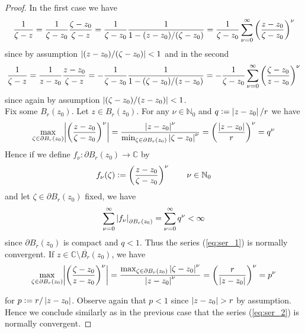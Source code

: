 \begin{enumerate}[label = \textbf{Exercise \arabic*.},wide = 0pt, itemsep=1.5ex]
	\begin{proof}
		In the first case we have
		\begin{equation}
			\frac{1}{\zeta - z} = \frac{1}{\zeta - z_0}\frac{\zeta - z_0}{\zeta - z} = \frac{1}{\zeta - z_0}\frac{1}{1 - (z - z_0)/(\zeta - z_0)} = \frac{1}{\zeta - z_0} \sum_{\nu = 0}^\infty \del{\frac{z - z_0}{\zeta - z_0}}^{\nu}
		\end{equation}
		\noindent since by assumption $\abs[0]{(z - z_0)/(\zeta - z_0)} < 1$ and in the second
		\begin{equation}
			\frac{1}{\zeta - z} = \frac{1}{z - z_0}\frac{z - z_0}{\zeta - z} = -\frac{1}{\zeta - z_0}\frac{1}{1 - (\zeta - z_0)/(z - z_0)} = -\frac{1}{\zeta - z_0} \sum_{\nu = 0}^\infty \del{\frac{\zeta - z_0}{z - z_0}}^{\nu}
		\end{equation}
		\noindent since again by assumption $\abs[0]{(\zeta - z_0)/(z - z_0)} < 1$.\\
		Fix some $B_r(z_0)$. Let $z \in B_r(z_0)$. For any $\nu \in \mathbb{N}_0$ and $q := \abs[0]{z - z_0}/r$ we have
		\begin{equation}
			\max_{\zeta \in \partial B_r(z_0)}\abs[3]{\del{\frac{z - z_0}{\zeta - z_0}}^\nu} = \frac{\abs[0]{z - z_0}^\nu}{\min_{\zeta \in \partial B_r(z_0)}\abs[0]{\zeta - z_0}^\nu} = \del[3]{\frac{\abs[0]{z - z_0}}{r}}^\nu = q^\nu
		\end{equation}
		Hence if we define $f_\nu: \partial B_r(z_0) \to \mathbb{C}$ by
		\begin{equation}
			f_\nu(\zeta) := \del{\frac{z - z_0}{\zeta - z_0}}^\nu \qquad \nu \in \mathbb{N}_0
		\end{equation}
		\noindent and let $\zeta \in \partial B_r(z_0)$ fixed, we have
		\begin{equation}
			\sum_{\nu = 0}^\infty \abs[0]{f_\nu}_{\partial B_r(z_0)} = \sum_{\nu = 0}^\infty q^\nu < \infty
		\end{equation}
		\noindent since $\partial B_r(z_0)$ is compact and $q < 1$. Thus the series (\ref{eq:ser_1}) is normally convergent. If $z \in \mathbb{C}\setminus \overline{B_r}(z_0)$, we have
		\begin{equation}
			\max_{\zeta \in \partial B_r(z_0)}\abs[3]{\del{\frac{\zeta - z_0}{z - z_0}}^\nu} = \frac{\max_{\zeta \in \partial B_r(z_0)}\abs[0]{\zeta - z_0}^\nu}{\abs[0]{z - z_0}^\nu} = \del[3]{\frac{r}{\abs[0]{z - z_0}}}^\nu = p^\nu
		\end{equation}

		\noindent for $p := r/\abs[0]{z - z_0}$. Observe again that $p < 1$ since $\abs[0]{z - z_0} > r$ by assumption. Hence we conclude similarly as in the previous case that the series (\ref{eq:ser_2}) is normally convergent.
	\end{proof}


\end{enumerate}
